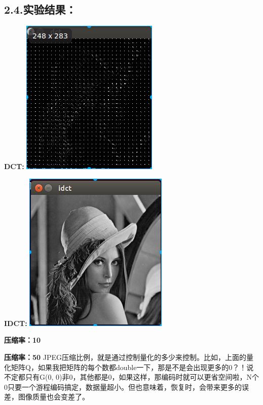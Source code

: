 \documentclass[a4paper, 12pt]{ctexart}
\begin{document}
\subsection{2.4.\hspace*{0.5em}实验结果：}\label{section}%

\noindent{}\textbf{DCT:}
\includegraphics[keepaspectratio=true,width=\dimmin{}{\dimwidth{0.90}}]{images/dct}{}%

\noindent{}\textbf{IDCT:}
\includegraphics[keepaspectratio=true,width=\dimmin{}{\dimwidth{0.90}}]{images/idct}{}%

\noindent{}\textbf{压缩率：10}

\textbf{压缩率：50}
JPEG压缩比例，就是通过控制量化的多少来控制。比如，上面的量化矩阵Q，如果我把矩阵的每个数都double一下，那是不是会出现更多的0？！说不定都只有G(0, 0)非0，其他都是0，如果这样，那编码时就可以更省空间啦，N个0只要一个游程编码搞定，数据量超小。但也意味着，恢复时，会带来更多的误差，图像质量也会变差了。%
\end{document}
